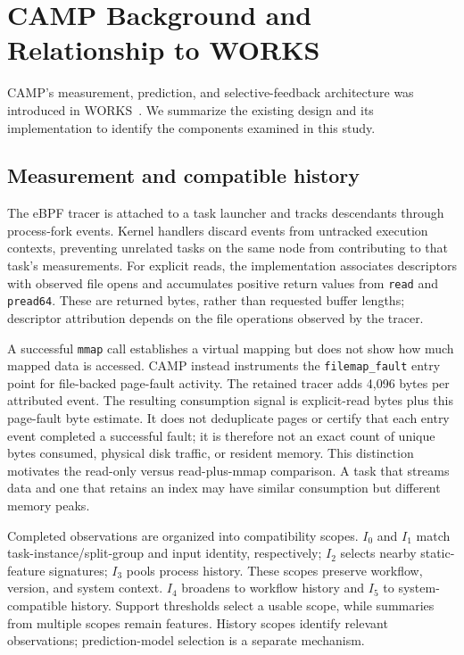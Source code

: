 \section{CAMP Background and Relationship to WORKS}
\label{sec:design}
CAMP's measurement, prediction, and selective-feedback architecture was
introduced in WORKS~\cite{camp2026works}. We summarize the existing design
and its implementation to identify the components examined in this study.

\subsection{Measurement and compatible history}
\label{sec:history}
The eBPF tracer is attached to a task launcher and tracks descendants
through process-fork events. Kernel handlers discard events from
untracked execution contexts, preventing unrelated tasks on the same node
from contributing to that task's measurements. For explicit reads, the
implementation associates descriptors with observed file opens and
accumulates positive return values from \texttt{read} and \texttt{pread64}.
These are returned bytes, rather than requested buffer lengths; descriptor
attribution depends on the file operations observed by the tracer.

A successful \texttt{mmap} call establishes a virtual mapping but does not
show how much mapped data is accessed. CAMP instead instruments the
\texttt{filemap\_fault} entry point for file-backed page-fault activity.
The retained tracer adds 4,096 bytes per attributed event. The resulting
consumption signal is explicit-read bytes plus this page-fault byte
estimate. It does not deduplicate pages or certify that each entry event
completed a successful fault; it is therefore not an exact count of unique
bytes consumed, physical disk traffic, or resident memory. This distinction
motivates the read-only versus read-plus-mmap comparison. A task that
streams data and one that retains an index may have similar consumption
but different memory peaks.

Completed observations are organized into compatibility scopes.
$I_0$ and $I_1$ match task-instance/split-group and input identity,
respectively; $I_2$ selects nearby static-feature signatures; $I_3$ pools
process history. These scopes preserve workflow, version, and system
context. $I_4$ broadens to workflow history and $I_5$ to system-compatible
history. Support thresholds select a usable scope, while summaries from
multiple scopes remain features. History scopes identify relevant
observations; prediction-model selection is a separate mechanism.

